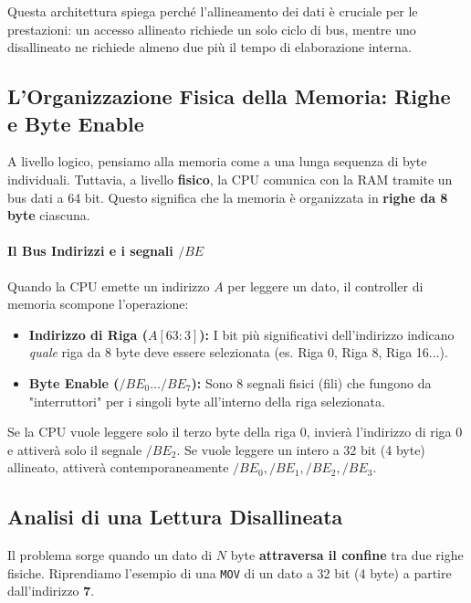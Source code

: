 \documentclass[a4paper,12pt]{article}
\begin{document}
	Questa architettura spiega perché l'allineamento dei dati è cruciale per le prestazioni: un accesso allineato richiede un solo ciclo di bus, mentre uno disallineato ne richiede almeno due più il tempo di elaborazione interna.
	\subsection{L'Organizzazione Fisica della Memoria: Righe e Byte Enable}
	
	A livello logico, pensiamo alla memoria come a una lunga sequenza di byte individuali. Tuttavia, a livello \textbf{fisico}, la CPU comunica con la RAM tramite un bus dati a 64 bit. Questo significa che la memoria è organizzata in \textbf{righe da 8 byte} ciascuna.
	
	\paragraph{Il Bus Indirizzi e i segnali $/BE$}
	Quando la CPU emette un indirizzo $A$ per leggere un dato, il controller di memoria scompone l'operazione:
	\begin{itemize}
		\item \textbf{Indirizzo di Riga ($A[63:3]$):} I bit più significativi dell'indirizzo indicano \textit{quale} riga da 8 byte deve essere selezionata (es. Riga 0, Riga 8, Riga 16...).
		\item \textbf{Byte Enable ($/BE_0 \dots /BE_7$):} Sono 8 segnali fisici (fili) che fungono da "interruttori" per i singoli byte all'interno della riga selezionata. 
	\end{itemize}
	
	Se la CPU vuole leggere solo il terzo byte della riga 0, invierà l'indirizzo di riga 0 e attiverà solo il segnale $/BE_2$. Se vuole leggere un intero a 32 bit (4 byte) allineato, attiverà contemporaneamente $/BE_0, /BE_1, /BE_2, /BE_3$.
	
	
	
	\subsection{Analisi di una Lettura Disallineata}
	
	Il problema sorge quando un dato di $N$ byte \textbf{attraversa il confine} tra due righe fisiche. Riprendiamo l'esempio di una \texttt{MOV} di un dato a 32 bit (4 byte) a partire dall'indirizzo \textbf{7}.
	
\end{document}
